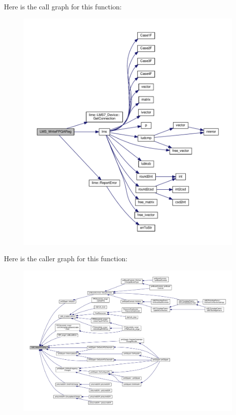 Here is the call graph for this function\+:
\nopagebreak
\begin{figure}[H]
\begin{center}
\leavevmode
\includegraphics[width=350pt]{df/de1/lms7__api_8cpp_a00772bc179a978aa279a6ce238a24c18_cgraph}
\end{center}
\end{figure}




Here is the caller graph for this function\+:
\nopagebreak
\begin{figure}[H]
\begin{center}
\leavevmode
\includegraphics[width=350pt]{df/de1/lms7__api_8cpp_a00772bc179a978aa279a6ce238a24c18_icgraph}
\end{center}
\end{figure}


